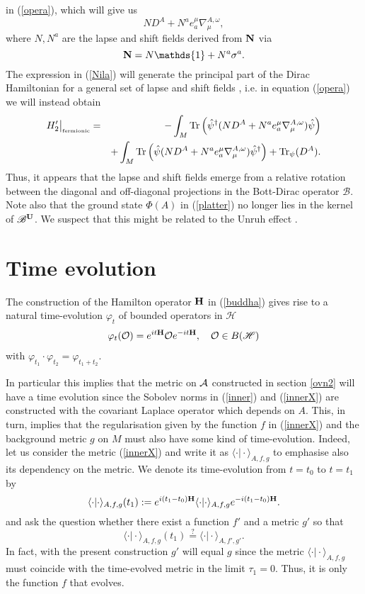 \documentclass[12pt]{article}
\newcommand{\nn}{\nonumber}
\def\m{\mu}
\def\oo{\omega}
\def\ca{{\cal A}}
\def\co{{\cal O}}
\begin{document}
in (\ref{opera}), which will give us
\begin{equation}
N D^A + N^a e_a^\m \nabla^{A,\oo}_\m,
\label{Nila}
\end{equation}
where $N,N^a$ are the lapse and shift fields derived from ${\bf N}$ via
$$
{\bf N} = N \mathds{1} + N^a \sigma^a.
$$
The expression in (\ref{Nila}) will generate the principal part of the Dirac Hamiltonian for a general set of lapse and shift fields \cite{Paschke}, i.e. in equation (\ref{opera}) we will instead obtain 
\begin{eqnarray}
H'_2\big\vert_{\mbox{\tiny fermionic}} &=&   -\int_M  \mbox{Tr} \left(  \hat{\psi}^\dagger (ND^A +N^a e_a^\m \nabla^{A,\oo}_\m)  \hat{\psi}\right)  
\nn\\&&
+ \int_M  \mbox{Tr} \left(  \hat{\psi}   (ND^A +N^a e_a^\m \nabla^{A,\oo}_\m) \hat{\psi}^\dagger\right)
+ \mbox{Tr}_\psi(D^A).
\label{operaX}
\end{eqnarray}
Thus, it appears that the lapse and shift fields emerge from a relative rotation between the diagonal and off-diagonal projections in the Bott-Dirac operator $\mathscr{B} $.
Note also that the ground state $\Phi (A)$ in (\ref{platter}) no longer lies in the kernel of $\mathscr{B}^{\bf U}$. We suspect that this might be related to the Unruh effect \cite{Unruh:1976db}.




\section{Time evolution}
\label{sec-time}

The construction of the Hamilton operator ${\bf H}$ in (\ref{buddha}) gives rise to a natural time-evolution $\varphi_t $ of bounded operators in $\mathscr{H}$
\begin{eqnarray}
\varphi_t (\co) = e^{i t {\bf H}} \co e^{- i t {\bf H}} ,\quad \co \in B(\mathscr{H})
\end{eqnarray}
with $\varphi_{t_1}\cdot \varphi_{t_2} = \varphi_{t_1 + t_2}$.

In particular this implies that the metric on $\ca$ constructed in section \ref{ovn2} will have a time evolution since the Sobolev norms in (\ref{inner}) and (\ref{innerX}) are constructed with the covariant Laplace operator which depends on $A$. This, in turn, implies that the regularisation given by the function $f$ in (\ref{innerX}) and the background metric $g$ on $M$ must also have some kind of time-evolution.
Indeed, let us consider the metric (\ref{innerX}) and write it as $\langle \cdot \vert \cdot \rangle_{A,f,g}$ to emphasise also its dependency on the metric. We denote its time-evolution from $t=t_0$ to $t=t_1$ by
$$
\langle \cdot \vert \cdot\rangle_{A,f,g} (t_1) := e^{i (t_1-t_0) {\bf H}} \langle \cdot \vert \cdot\rangle_{A,f,g}  e^{- i (t_1-t_0) {\bf H}}.
$$
and ask the question whether there exist a function $f'$ and a metric $g'$ so that
$$
\langle \cdot \vert \cdot\rangle_{A,f,g} (t_1) \stackrel{?}{=} \langle \cdot \vert \cdot\rangle_{A,f',g'}.
$$
In fact, with the present construction $g'$ will equal $g$ since the metric $\langle \cdot \vert \cdot\rangle_{A,f,g} $ must coincide with the time-evolved metric in the limit $\tau_1=0$. Thus, it is only the function $f$ that evolves.
\end{document}
